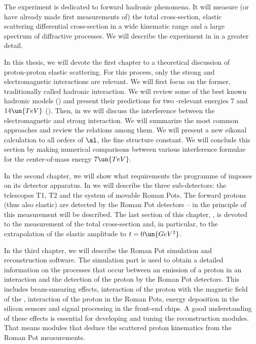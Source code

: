 The  experiment is dedicated to forward hadronic phenomena. It will measure (or have already made first measurements of) the total cross-section, elastic scattering differential cross-section in a wide kinematic range and a large spectrum of diffractive processes. We will describe the experiment in  in a greater detail.



In this thesis, we will devote the first chapter to a theoretical discussion of proton-proton elastic scattering. For this process, only the strong and electromagnetic interactions are relevant. We will first focus on the former, traditionally called hadronic interaction. We will review some of the best known hadronic models () and present their predictions for two -relevant energies $7$ and $14\un{TeV}$ (). Then, in  we will discuss the interference between the electromagnetic and strong interaction. We will summarize the most common approaches and review the relations among them. We will present a new eikonal calculation to all orders of $\al$, the fine structure constant. We will conclude this section by making numerical comparisons between various interference formulae for the center-of-mass energy $7\un{TeV}$.

In the second chapter, we will show what requirements the programme of  imposes on its detector apparatus. In  we will describe the three sub-detectors: the telescopes T1, T2 and the system of movable Roman Pots. The forward protons (thus also elastic) are detected by the Roman Pot detectors -- in  the principle of this measurement will be described. The last section of this chapter, , is devoted to the measurement of the total cross-section and, in particular, to the extrapolation of the elastic amplitude to $t=0\un{GeV^2}$.

In the third chapter, we will describe the Roman Pot simulation and reconstruction software. The simulation part is used to obtain a detailed information on the processes that occur between an emission of a proton in an interaction and the detection of the proton by the Roman Pot detectors. This includes beam-smearing effects, interaction of the proton with the magnetic field of the , interaction of the proton in the Roman Pots, energy deposition in the silicon sensors and signal processing in the front-end chips. A good understanding of these effects is essential for developing and tuning the reconstruction modules. That means modules that deduce the scattered proton kinematics from the Roman Pot measurements.

